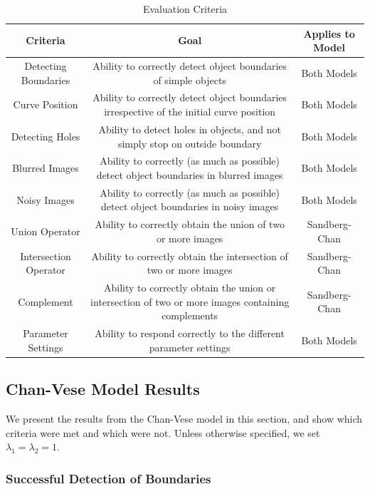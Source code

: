 \documentclass[10pt,journal,letterpaper,compsoc]{IEEEtran}
\begin{document}
\begin{table}[h!t!]
\centering
\begin{tabular}{ c | c |c}
\textbf{Criteria} & \textbf{Goal} & \textbf{Applies to Model}\\
\hline\hline
Detecting Boundaries & Ability to correctly detect object boundaries of simple objects& Both Models\\
\hline
Curve Position & Ability to correctly detect object boundaries irrespective of the initial curve position & Both Models\\
\hline
Detecting Holes & Ability to detect holes in objects, and not simply stop on outside boundary & Both Models\\
\hline
Blurred Images & Ability to correctly (as much as possible) detect object boundaries in blurred images & Both Models\\
\hline
Noisy Images & Ability to correctly (as much as possible) detect object boundaries in noisy images & Both Models\\
\hline
Union Operator & Ability to correctly obtain the union of two or more images & Sandberg-Chan\\
\hline
Intersection Operator & Ability to correctly obtain the intersection of two or more images & Sandberg-Chan\\
\hline
Complement & Ability to correctly obtain the union or intersection of two or more images containing complements & Sandberg-Chan\\
\hline
Parameter Settings & Ability to respond correctly to the different parameter settings & Both Models\\
\end{tabular}
\centering
\caption{Evaluation Criteria}
\label{tab:criteria}
\end{table}

\subsection{Chan-Vese Model Results}

We present the results from the Chan-Vese model in this section, and show which criteria were met and which were not. Unless otherwise specified, we set
$\lambda_{1} = \lambda_{2} = 1$.

\subsubsection*{Successful Detection of Boundaries}
\end{document}
